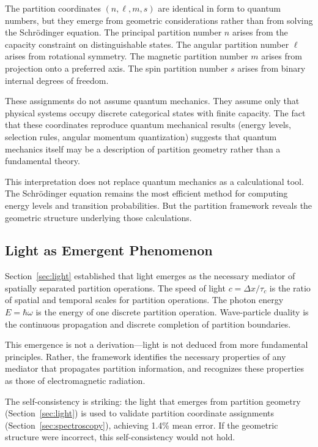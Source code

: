 \documentclass[twocolumn,superscriptaddress,prb,10pt]{revtex4-2}
\begin{document}
The partition coordinates $(n, \ell, m, s)$ are identical in form to quantum numbers, but they emerge from geometric considerations rather than from solving the Schrödinger equation. The principal partition number $n$ arises from the capacity constraint on distinguishable states. The angular partition number $\ell$ arises from rotational symmetry. The magnetic partition number $m$ arises from projection onto a preferred axis. The spin partition number $s$ arises from binary internal degrees of freedom.

These assignments do not assume quantum mechanics. They assume only that physical systems occupy discrete categorical states with finite capacity. The fact that these coordinates reproduce quantum mechanical results (energy levels, selection rules, angular momentum quantization) suggests that quantum mechanics itself may be a description of partition geometry rather than a fundamental theory.

This interpretation does not replace quantum mechanics as a calculational tool. The Schrödinger equation remains the most efficient method for computing energy levels and transition probabilities. But the partition framework reveals the geometric structure underlying those calculations.

\subsection{Light as Emergent Phenomenon}

Section~\ref{sec:light} established that light emerges as the necessary mediator of spatially separated partition operations. The speed of light $c = \Delta x / \tau_c$ is the ratio of spatial and temporal scales for partition operations. The photon energy $E = \hbar\omega$ is the energy of one discrete partition operation. Wave-particle duality is the continuous propagation and discrete completion of partition boundaries.

This emergence is not a derivation—light is not deduced from more fundamental principles. Rather, the framework identifies the necessary properties of any mediator that propagates partition information, and recognizes these properties as those of electromagnetic radiation.

The self-consistency is striking: the light that emerges from partition geometry (Section~\ref{sec:light}) is used to validate partition coordinate assignments (Section~\ref{sec:spectroscopy}), achieving 1.4\% mean error. If the geometric structure were incorrect, this self-consistency would not hold.
\end{document}
